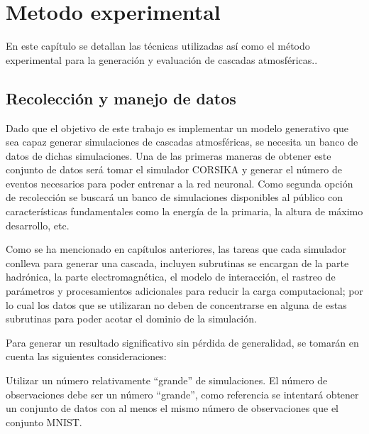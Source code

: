 
\chapter{Metodo experimental} %

\label{Chapter4} %

En este capítulo se detallan las técnicas utilizadas así como el método experimental para la generación y evaluación de cascadas atmosféricas.. 

\section{Recolección y manejo de datos}

Dado que el objetivo de este trabajo es implementar un modelo generativo que sea capaz generar simulaciones de cascadas atmosféricas, se necesita un banco de datos de dichas simulaciones. Una de las primeras maneras de obtener este conjunto de datos será tomar el simulador CORSIKA y generar el número de eventos necesarios para poder entrenar a la red neuronal. Como segunda opción de recolección se buscará un banco de simulaciones disponibles al público con características fundamentales como la energía de la primaria, la altura de máximo desarrollo, etc.

Como se ha mencionado en capítulos anteriores, las tareas que cada simulador conlleva para generar una cascada, incluyen subrutinas se encargan de la parte hadrónica, la parte electromagnética, el modelo de interacción, el rastreo de parámetros y procesamientos adicionales para reducir la carga computacional; por lo cual los datos que se utilizaran no deben de concentrarse en alguna de estas subrutinas para poder acotar el dominio de la simulación. 


Para generar un resultado significativo sin pérdida de generalidad, se tomarán en cuenta las siguientes consideraciones:

Utilizar un número relativamente “grande” de simulaciones.
El número de observaciones debe ser un número “grande”, como referencia se intentará obtener un conjunto de datos con al menos el mismo número de observaciones que el conjunto MNIST.  

